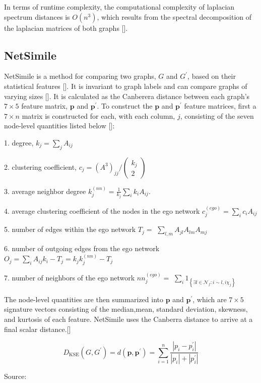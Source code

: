 In terms of runtime complexity, the computational complexity of laplacian spectrum distances is $O(n^{3})$, which results from the spectral decomposition of the laplacian matrices of both graphs [\cite{Tsitsulin:2018}].

\subsection{NetSimile}
NetSimile is a method for comparing two graphs, $G$ and $G^{\prime}$, based on their statistical features [\cite{Tsitsulin:2018}]. It is invariant to graph labels and can compare graphs of varying sizes [\cite{Berlingerio:2012}]. It is calculated as the Canberera distance between each graph's $7 \times 5$ feature matrix, $\mathbf{p}$ and $\mathbf{p}^{\prime}$. To construct the $\mathbf{p}$ and $\mathbf{p}^{\prime}$ feature matrices, first a $7 \times n$ matrix is constructed for each, with each column, $j$, consisting of the seven node-level quantities listed below [\cite{Tsitsulin:2018}]:

1. degree, $k_{j}=\sum_{j} A_{i j}$

2. clustering coefficient, $c_{j}=\left(A^{3}\right)_{j j} /\left(\begin{array}{c}k_{j} \\ 2\end{array}\right)$

3. average neighbor degree $k_{j}^{(n n)}=\frac{1}{k_{j}} \sum_{i} k_{i} A_{i j}$.

4. average clustering coefficient of the nodes in the ego network $c_{j}^{(e g o)}=\sum_{i} c_{i} A_{i j}$

5. number of edges within the ego network $T_{j}=$ $\sum_{l, m} A_{j l} A_{l m} A_{m j}$

6. number of outgoing edges from the ego network $O_{j}=\sum_{i} A_{i j} k_{i}-T_{j}=k_{j} k_{j}^{(n n)}-T_{j}$

7. number of neighbors of the ego network $n n_{j}^{(e g o)}=$ $\sum_{i} 1_{\left\{\exists l \in \mathcal{N}_{f}: i \sim l, i \chi_{j}\right\}}$


The node-level quantities are then summarized into $\mathbf{p}$ and $\mathbf{p}^{\prime}$, which are $7 \times 5$ signature vectors consisting of the median,mean, standard deviation, skewness, and kurtosis of each feature. NetSimile uses the Canberra distance to arrive at a final scalar distance.[\cite{Tsitsulin:2018}]

\begin{equation}
D_{\mathrm{KSE}}\left(G, G^{\prime}\right)=d\left(\mathbf{p}, \mathbf{p}^{\prime}\right)=\sum_{i=1}^{n} \frac{\left|p_{i}-p_{i}^{\prime}\right|}{\left|p_{i}\right|+\left|p_{i}^{\prime}\right|}
\end{equation}
\caption{Source: \cite{Tsitsulin:2018}}

